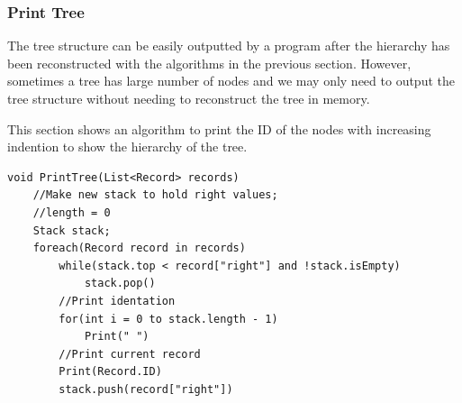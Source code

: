 \subsubsection{Print Tree}

The tree structure can be easily outputted by a program after the hierarchy has been reconstructed with the algorithms in the previous section. However, sometimes a tree has large number of nodes and we may only need to output the tree structure without needing to reconstruct the tree in memory.

This section shows an algorithm to print the ID of the nodes with increasing indention to show the hierarchy of the tree.

\begin{minipage}{\linewidth}
\begin{lstlisting}[frame=single]
void PrintTree(List<Record> records)
	//Make new stack to hold right values; 
	//length = 0
	Stack stack;
	foreach(Record record in records)
		while(stack.top < record["right"] and !stack.isEmpty)
			stack.pop()
		//Print identation
		for(int i = 0 to stack.length - 1) 
			Print(" ")
		//Print current record
		Print(Record.ID)
		stack.push(record["right"])
\end{lstlisting}	
\end{minipage}
